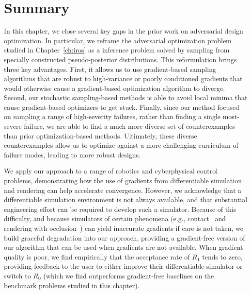 \section{Summary}

In this chapter, we close several key gaps in the prior work on adversarial design optimization. In particular, we reframe the adversarial optimization problem studied in Chapter~\ref{ch:iros} as a inference problem solved by sampling from specially constructed pseudo-posterior distributions. This reformulation brings three key advantages. First, it allows us to use gradient-based sampling algorithms that are robust to high-variance or poorly conditioned gradients that would otherwise cause a gradient-based optimization algorithm to diverge. Second, our stochastic sampling-based methods is able to avoid local minima that cause gradient-based optimizers to get stuck. Finally, since our method focused on sampling a range of high-severity failures, rather than finding a single most-severe failure, we are able to find a much more diverse set of counterexamples than prior optimization-based methods. Ultimately, these diverse counterexamples allow us to optimize against a more challenging curriculum of failure modes, leading to more robust designs.

We apply our approach to a range of robotics and cyberphysical control problems, demonstrating how the use of gradients from differentiable simulation and rendering can help accelerate convergence. However, we acknowledge that a differentiable simulation environment is not always available, and that substantial engineering effort can be required to develop such a simulator. Because of this difficulty, and because simulators of certain phenomena (e.g., contact~\cite{huDiffTaichiDifferentiableProgramming2019} and rendering with occlusion~\cite{zhaoPhysicsbasedDifferentiableRendering2020}) can yield inaccurate gradients if care is not taken, we build graceful degradation into our approach, providing a gradient-free version of our algorithm that can be used when gradients are not available. When gradient quality is poor, we find empirically that the acceptance rate of $R_1$ tends to zero, providing feedback to the user to either improve their differentiable simulator or switch to $R_0$ (which we find outperforms gradient-free baselines on the benchmark problems studied in this chapter).

